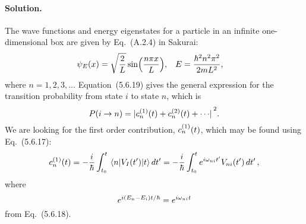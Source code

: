 \documentclass[11pt]{article}
\newcommand{\beq}{\begin{equation*}}
\newcommand{\eeq}{\end{equation*}}
\newcommand{\beqn}{\begin{equation}}
\newcommand{\eeqn}{\end{equation}}
\newenvironment{solution}
{
    \paragraph{Solution.}
    \ignorespaces
}
{
}
\begin{document}
\begin{solution}
	The wave functions and energy eigenstates for a particle in an infinite one-dimensional box are given by Eq.~(A.2.4) in Sakurai:
	\begin{align*}
		\psi_E(x) &= \sqrt{\frac{2}{L}} \sin(\frac{n \pi x}{L}), &
		E &= \frac{\hbar^2 n^2 \pi^2}{2 m L^2},
	\end{align*}
	where $n = 1, 2, 3, \ldots$  Equation~(5.6.19) gives the general expression for the transition probability from state $i$ to state $n$, which is
	\beq
		P(i \to n) = \abs*{\cnqt + c_n^{(2)}(t) + \cdots}^2.
	\eeq
	We are looking for the first order contribution, $c_n^{(1)}(t)$, which may be found using Eq.~(5.6.17):
	\beqn \label{cn1}
		\cnqt = -\frac{i}{\hbar} \inttot \mel{n}{V_I(t')}{t} \dtp
		= -\frac{i}{\hbar} \inttot e^{i \omgni t'} V_{n i}(t') \dtp,
	\eeqn
	where
	\beq
		e^{i (E_n - E_i) t / \hbar} = e^{i \omgni t}
	\eeq
	from Eq.~(5.6.18).
	

\end{solution}
\end{document}
